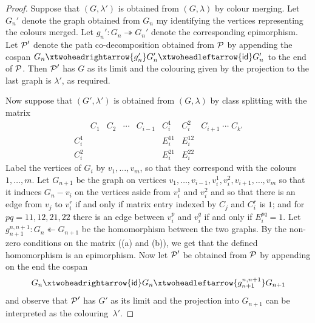 \begin{proof}
    Suppose that $(G,\lambda')$ is obtained from $(G,\lambda)$ by colour merging. Let $G_n'$ denote the graph obtained from $G_n$ my identifying the vertices representing the colours merged. Let $g_n':G_n\twoheadrightarrow G_n'$ denote the corresponding epimorphism. Let $\operatorname{\mathcal{P}}'$ denote the path co-decomposition obtained from $\operatorname{\mathcal{P}}$ by appending the cospan $G_n\xtwoheadrightarrow{g_n'} G_n'\xtwoheadleftarrow{\cat{id}} G_n'$ to the end of $\operatorname{\mathcal{P}}$. Then $\operatorname{\mathcal{P}}'$ has $G$ as its limit and the colouring given by the projection to the last graph is $\lambda'$, as required.

    Now suppose that $(G',\lambda')$ is obtained from $(G,\lambda)$ by class splitting with the matrix
    \[
        \begin{array}{c|cccc|cc|c}
            & C_1 & C_2 & \cdots & C_{i-1} & C_i^1 & C_i^2 & C_{i+1} \; \cdots \; C_{k'} \\
            \hline
            C_i^1   &  &  &  &  & E_{i}^{11} & E_i^{12} &  \\
            C_i^2  &  &  &  &  & E_i^{21} & E_i^{22} &  
        \end{array}
    \]
    Label the vertices of $G_i$ by $v_1,\ldots,v_m$, so that they correspond with the colours $1,\ldots,m$. Let $G_{n+1}$ be the graph on vertices $v_1,\ldots,v_{i-1},v_i^1,v_i^2,v_{i+1},\ldots,v_m$ so that it induces $G_n-v_i$ on the vertices aside from $v_i^1$ and $v_i^2$ and so that there is an edge from $v_j$ to $v_i^r$ if and only if matrix entry indexed by $C_j$ and $C_i^r$ is $1$; and for $pq=11,12,21,22$ there is an edge between $v_i^p$ and $v_i^q$ if and only if $E_i^{pq}=1$. Let $g_{n+1}^{n,n+1}:G_n\twoheadleftarrow G_{n+1}$ be the homomorphism between the two graphs. By the non-zero conditions on the matrix ((a) and (b)), we get that the defined homomorphism is an epimorphism. Now let $\operatorname{\mathcal{P}}'$ be obtained from $\operatorname{\mathcal{P}}$ by appending on the end the cospan
    \[
    G_n\xtwoheadrightarrow{\cat{id}} G_n\xtwoheadleftarrow{g_{n+1}^{n,n+1}} G_{n+1}
    \]
    and observe that $\operatorname{\mathcal{P}}'$ has $G'$ as its limit and the projection into $G_{n+1}$ can be interpreted as the colouring~$\lambda'$.
\end{proof}

